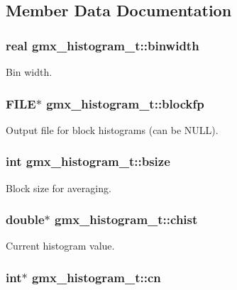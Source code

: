 \subsection{\-Member \-Data \-Documentation}
\hypertarget{structgmx__histogram__t_ae21cb97b8c0cb98f65650fca713fb8b5}{
\subsubsection[{binwidth}]{\setlength{\rightskip}{0pt plus 5cm}real {\bf gmx\-\_\-histogram\-\_\-t\-::binwidth}}}\label{structgmx__histogram__t_ae21cb97b8c0cb98f65650fca713fb8b5}
\-Bin width. \hypertarget{structgmx__histogram__t_a44ad1d0d9221e7a0019717f77d57e93b}{
\subsubsection[{blockfp}]{\setlength{\rightskip}{0pt plus 5cm}\-F\-I\-L\-E$\ast$ {\bf gmx\-\_\-histogram\-\_\-t\-::blockfp}}}\label{structgmx__histogram__t_a44ad1d0d9221e7a0019717f77d57e93b}
\-Output file for block histograms (can be \-N\-U\-L\-L). \hypertarget{structgmx__histogram__t_afd5003c83824d3632eac7fc599b56983}{
\subsubsection[{bsize}]{\setlength{\rightskip}{0pt plus 5cm}int {\bf gmx\-\_\-histogram\-\_\-t\-::bsize}}}\label{structgmx__histogram__t_afd5003c83824d3632eac7fc599b56983}
\-Block size for averaging. \hypertarget{structgmx__histogram__t_a7b8f859ea0b6a9708336f1c174c22eb0}{
\subsubsection[{chist}]{\setlength{\rightskip}{0pt plus 5cm}double$\ast$ {\bf gmx\-\_\-histogram\-\_\-t\-::chist}}}\label{structgmx__histogram__t_a7b8f859ea0b6a9708336f1c174c22eb0}
\-Current histogram value. \hypertarget{structgmx__histogram__t_aca07c93b198a997760d9dd6bee4bc521}{
\subsubsection[{cn}]{\setlength{\rightskip}{0pt plus 5cm}int$\ast$ {\bf gmx\-\_\-histogram\-\_\-t\-::cn}}}\label{structgmx__histogram__t_aca07c93b198a997760d9dd6bee4bc521}

